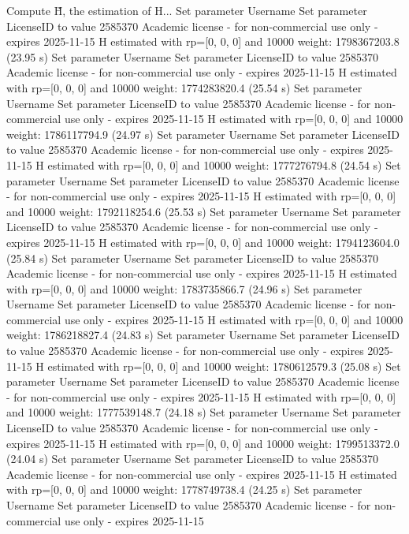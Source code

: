 Compute H̃, the estimation of H...
Set parameter Username
Set parameter LicenseID to value 2585370
Academic license - for non-commercial use only - expires 2025-11-15
  H estimated with rp=[0, 0, 0] and 10000 weight:  1798367203.8  (23.95 s)
Set parameter Username
Set parameter LicenseID to value 2585370
Academic license - for non-commercial use only - expires 2025-11-15
  H estimated with rp=[0, 0, 0] and 10000 weight:  1774283820.4  (25.54 s)
Set parameter Username
Set parameter LicenseID to value 2585370
Academic license - for non-commercial use only - expires 2025-11-15
  H estimated with rp=[0, 0, 0] and 10000 weight:  1786117794.9  (24.97 s)
Set parameter Username
Set parameter LicenseID to value 2585370
Academic license - for non-commercial use only - expires 2025-11-15
  H estimated with rp=[0, 0, 0] and 10000 weight:  1777276794.8  (24.54 s)
Set parameter Username
Set parameter LicenseID to value 2585370
Academic license - for non-commercial use only - expires 2025-11-15
  H estimated with rp=[0, 0, 0] and 10000 weight:  1792118254.6  (25.53 s)
Set parameter Username
Set parameter LicenseID to value 2585370
Academic license - for non-commercial use only - expires 2025-11-15
  H estimated with rp=[0, 0, 0] and 10000 weight:  1794123604.0  (25.84 s)
Set parameter Username
Set parameter LicenseID to value 2585370
Academic license - for non-commercial use only - expires 2025-11-15
  H estimated with rp=[0, 0, 0] and 10000 weight:  1783735866.7  (24.96 s)
Set parameter Username
Set parameter LicenseID to value 2585370
Academic license - for non-commercial use only - expires 2025-11-15
  H estimated with rp=[0, 0, 0] and 10000 weight:  1786218827.4  (24.83 s)
Set parameter Username
Set parameter LicenseID to value 2585370
Academic license - for non-commercial use only - expires 2025-11-15
  H estimated with rp=[0, 0, 0] and 10000 weight:  1780612579.3  (25.08 s)
Set parameter Username
Set parameter LicenseID to value 2585370
Academic license - for non-commercial use only - expires 2025-11-15
  H estimated with rp=[0, 0, 0] and 10000 weight:  1777539148.7  (24.18 s)
Set parameter Username
Set parameter LicenseID to value 2585370
Academic license - for non-commercial use only - expires 2025-11-15
  H estimated with rp=[0, 0, 0] and 10000 weight:  1799513372.0  (24.04 s)
Set parameter Username
Set parameter LicenseID to value 2585370
Academic license - for non-commercial use only - expires 2025-11-15
  H estimated with rp=[0, 0, 0] and 10000 weight:  1778749738.4  (24.25 s)
Set parameter Username
Set parameter LicenseID to value 2585370
Academic license - for non-commercial use only - expires 2025-11-15
